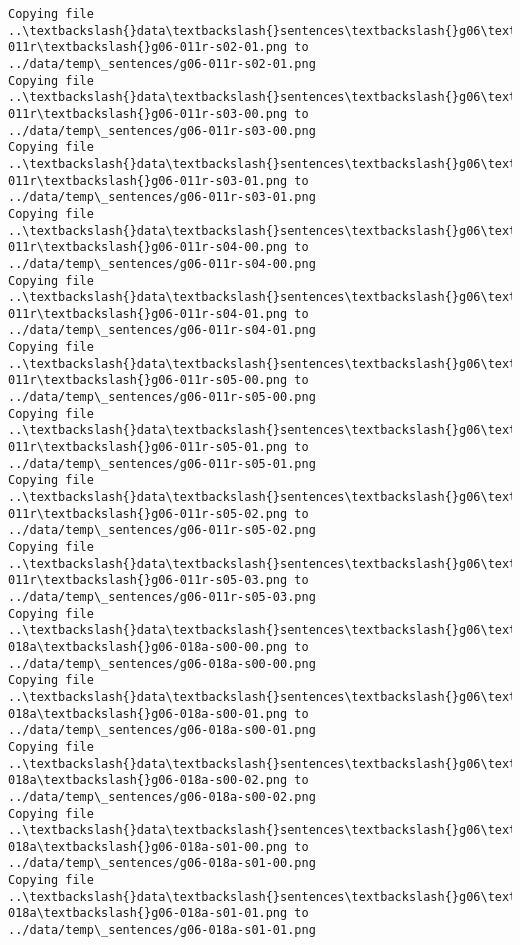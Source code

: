 \documentclass[11pt]{article}
\begin{document}
\begin{Verbatim}[commandchars=\\\{\}]
Copying file ..\textbackslash{}data\textbackslash{}sentences\textbackslash{}g06\textbackslash{}g06-011r\textbackslash{}g06-011r-s02-01.png to
../data/temp\_sentences/g06-011r-s02-01.png
Copying file ..\textbackslash{}data\textbackslash{}sentences\textbackslash{}g06\textbackslash{}g06-011r\textbackslash{}g06-011r-s03-00.png to
../data/temp\_sentences/g06-011r-s03-00.png
Copying file ..\textbackslash{}data\textbackslash{}sentences\textbackslash{}g06\textbackslash{}g06-011r\textbackslash{}g06-011r-s03-01.png to
../data/temp\_sentences/g06-011r-s03-01.png
Copying file ..\textbackslash{}data\textbackslash{}sentences\textbackslash{}g06\textbackslash{}g06-011r\textbackslash{}g06-011r-s04-00.png to
../data/temp\_sentences/g06-011r-s04-00.png
Copying file ..\textbackslash{}data\textbackslash{}sentences\textbackslash{}g06\textbackslash{}g06-011r\textbackslash{}g06-011r-s04-01.png to
../data/temp\_sentences/g06-011r-s04-01.png
Copying file ..\textbackslash{}data\textbackslash{}sentences\textbackslash{}g06\textbackslash{}g06-011r\textbackslash{}g06-011r-s05-00.png to
../data/temp\_sentences/g06-011r-s05-00.png
Copying file ..\textbackslash{}data\textbackslash{}sentences\textbackslash{}g06\textbackslash{}g06-011r\textbackslash{}g06-011r-s05-01.png to
../data/temp\_sentences/g06-011r-s05-01.png
Copying file ..\textbackslash{}data\textbackslash{}sentences\textbackslash{}g06\textbackslash{}g06-011r\textbackslash{}g06-011r-s05-02.png to
../data/temp\_sentences/g06-011r-s05-02.png
Copying file ..\textbackslash{}data\textbackslash{}sentences\textbackslash{}g06\textbackslash{}g06-011r\textbackslash{}g06-011r-s05-03.png to
../data/temp\_sentences/g06-011r-s05-03.png
Copying file ..\textbackslash{}data\textbackslash{}sentences\textbackslash{}g06\textbackslash{}g06-018a\textbackslash{}g06-018a-s00-00.png to
../data/temp\_sentences/g06-018a-s00-00.png
Copying file ..\textbackslash{}data\textbackslash{}sentences\textbackslash{}g06\textbackslash{}g06-018a\textbackslash{}g06-018a-s00-01.png to
../data/temp\_sentences/g06-018a-s00-01.png
Copying file ..\textbackslash{}data\textbackslash{}sentences\textbackslash{}g06\textbackslash{}g06-018a\textbackslash{}g06-018a-s00-02.png to
../data/temp\_sentences/g06-018a-s00-02.png
Copying file ..\textbackslash{}data\textbackslash{}sentences\textbackslash{}g06\textbackslash{}g06-018a\textbackslash{}g06-018a-s01-00.png to
../data/temp\_sentences/g06-018a-s01-00.png
Copying file ..\textbackslash{}data\textbackslash{}sentences\textbackslash{}g06\textbackslash{}g06-018a\textbackslash{}g06-018a-s01-01.png to
../data/temp\_sentences/g06-018a-s01-01.png

\end{Verbatim}
\end{document}
